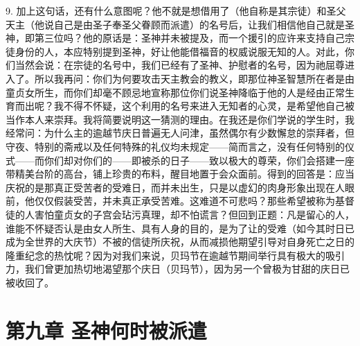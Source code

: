 9. 加上这句话，还有什么意图呢？他不就是想借用了（他自称是其宗徒）和圣父天主（他说自己是由圣子奉圣父眷顾而派遣）的名号后，让我们相信他自己就是圣神，即第三位吗？他的原话是：圣神并未被提及，而一个援引的应许来支持自己宗徒身份的人，本应特别提到圣神，好让他能借福音的权威说服无知的人。对此，你们当然会说：在宗徒的名号中，我们已经有了圣神、护慰者的名号，因为祂屈尊进入了。所以我再问：你们为何要攻击天主教会的教义，即那位神圣智慧所在者是由童贞女所生，而你们却毫不顾忌地宣称那位你们说圣神降临于他的人是经由正常生育而出呢？我不得不怀疑，这个利用的名号来进入无知者的心灵，是希望他自己被当作本人来崇拜。我将简要说明这一猜测的理由。在我还是你们学说的学生时，我经常问：为什么主的逾越节庆日普遍无人问津，虽然偶尔有少数懈怠的崇拜者，但守夜、特别的斋戒以及任何特殊的礼仪均未规定——简而言之，没有任何特别的仪式——而你们却对你们的——即被杀的日子——致以极大的尊荣，你们会搭建一座带精美台阶的高台，铺上珍贵的布料，醒目地置于会众面前。得到的回答是：应当庆祝的是那真正受苦者的受难日，而并未出生，只是以虚幻的肉身形象出现在人眼前，他仅仅假装受苦，并未真正承受苦难。这难道不可悲吗？那些希望被称为基督徒的人害怕童贞女的子宫会玷污真理，却不怕谎言？但回到正题：凡是留心的人，谁能不怀疑否认是由女人所生、具有人身的目的，是为了让的受难（如今其时日已成为全世界的大庆节）不被的信徒所庆祝，从而减损他期望引导对自身死亡之日的隆重纪念的热忱呢？因为对我们来说，贝玛节在逾越节期间举行具有极大的吸引力，我们曾更加热切地渴望那个庆日（贝玛节），因为另一个曾极为甘甜的庆日已被收回了。\par


\section{第九章 圣神何时被派遣}

